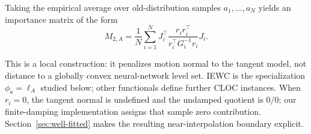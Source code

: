 Taking the empirical average over old-distribution samples $a_1,\dots,a_N$ yields an importance matrix of the form
\[
M_{2,A} =
\frac{1}{N}\sum_{i=1}^N  
J_i^\top  
\frac{r_i r_i^\top}{r_i^\top G_i^{-1}r_i}  
J_i.  
\]

This is a local construction: it penalizes motion normal to the tangent model, not distance to a globally convex neural-network level set. IEWC is the specialization $\phi_a=\ell_A$ studied below; other functionals define further CLOC instances. When $r_i=0$, the tangent normal is undefined and the undamped quotient is $0/0$; our finite-damping implementation assigns that sample zero contribution. Section~\ref{sec:well-fitted} makes the resulting near-interpolation boundary explicit.
